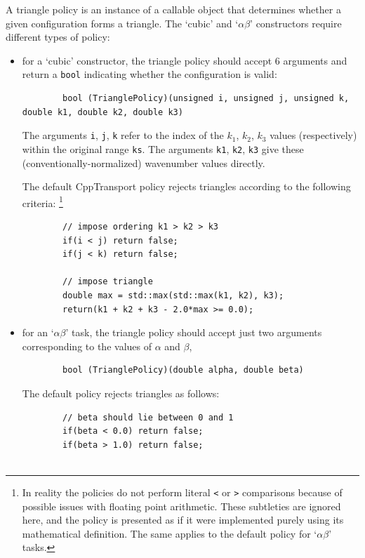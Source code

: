\documentclass[11pt,a4paper]{article}
\newcommand{\packagefont}{\sffamily}
\newcommand{\CppTransport}{{\packagefont CppTransport}}
\begin{document}
A triangle policy is an instance of a callable object that
determines whether a given configuration forms a triangle.
The `cubic' and `$\alpha\beta$' constructors require different types of policy:
\begin{itemize}
    \item for a `cubic' constructor, the triangle policy should accept 6 arguments
    and return a \texttt{bool} indicating whether the configuration is valid:
    \begin{verbatim}
        bool (TrianglePolicy)(unsigned i, unsigned j, unsigned k, double k1, double k2, double k3)
    \end{verbatim}
    The arguments \texttt{i}, \texttt{j}, \texttt{k}
    refer to the index of the $k_1$, $k_2$, $k_3$ values (respectively)
    within the original range \texttt{ks}.
    The arguments \texttt{k1}, \texttt{k2}, \texttt{k3}
    give these (conventionally-normalized) wavenumber values directly.
    
    The default {\CppTransport} policy rejects triangles according to the following
    criteria:%
        \footnote{In reality the policies do not perform literal \texttt{<}
        or \texttt{>} comparisons because of possible issues with
        floating point arithmetic. These subtleties are ignored here, and the
        policy is presented as if it were implemented purely using its
        mathematical definition. The same applies to the default
        policy for `$\alpha\beta$' tasks.}
    \begin{verbatim}
        // impose ordering k1 > k2 > k3
        if(i < j) return false;
        if(j < k) return false;

        // impose triangle
        double max = std::max(std::max(k1, k2), k3);
        return(k1 + k2 + k3 - 2.0*max >= 0.0);
    \end{verbatim}

    \item for an `$\alpha\beta$' task, the triangle policy should accept just two
    arguments corresponding to the values of $\alpha$ and $\beta$,
    \begin{verbatim}
        bool (TrianglePolicy)(double alpha, double beta)    
    \end{verbatim}
    The default policy rejects triangles as follows:
    \begin{verbatim}
        // beta should lie between 0 and 1
        if(beta < 0.0) return false;
        if(beta > 1.0) return false;


\end{verbatim}
\end{itemize}
\end{document}
